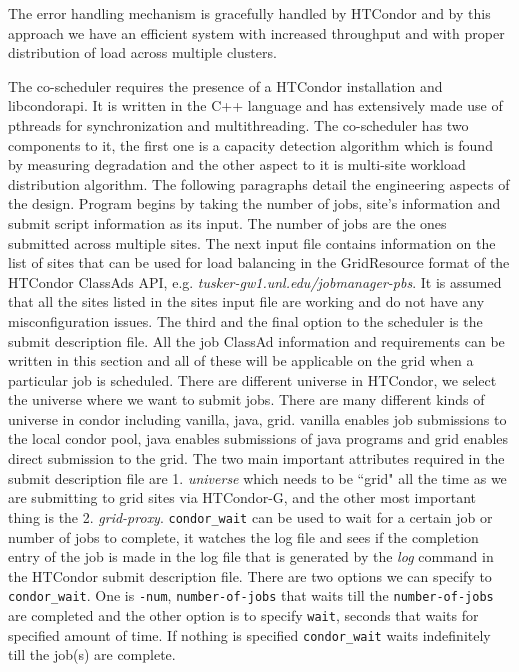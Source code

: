 \documentclass[ms,electronic,double]{nuthesis}
\begin{document}
 The error handling mechanism is gracefully handled by 
 HTCondor and by this approach we have an efficient system with increased throughput and with proper distribution
  of load across multiple clusters.  
        
 
 
 


The co-scheduler requires the presence of a HTCondor installation and libcondorapi.
It is written in the C++ language and has extensively made use of pthreads for 
synchronization and multithreading. The co-scheduler has two components to it, the first one is a capacity detection
algorithm which is found by measuring degradation and the other aspect to it is 
multi-site workload distribution algorithm. The following paragraphs detail the 
engineering aspects of the design. Program begins by taking the number of jobs, site's information and submit script 
information as its input. The number of jobs are the ones submitted across 
multiple sites. The next input file contains information on the list of sites that can be used 
for load balancing in the GridResource format of the HTCondor ClassAds API, e.g. \emph{tusker-gw1.unl.edu/jobmanager-pbs}.
It is assumed that all the sites listed in the sites input file are working and 
do not have any misconfiguration issues. The third and the final option to the 
scheduler is the submit description file. All the job ClassAd information and 
requirements can be written in this section and all of these will be applicable on the grid when a particular job is 
scheduled. There are different universe in HTCondor, we select the universe where we want to submit 
jobs. There are many different kinds of universe in condor including vanilla, java, grid. vanilla enables job submissions to the local
condor pool, java enables submissions of java programs and grid enables direct submission to the grid. 
The two main important attributes required in the submit description 
file are 1. \emph{universe} which needs to be ``grid" all the time as we are submitting 
to grid sites via HTCondor-G, and the other most important thing is the 
2. \emph{grid-proxy}. 
\texttt{condor\_wait} \cite{manual56} can be used to wait for a certain job or 
number of jobs to complete, it watches the log file and sees if the completion 
entry of the job is made in the log file that is generated by the \emph{log} 
command in the HTCondor submit description file. There are two options we can 
specify to \texttt{condor\_wait}. One is \texttt{-num}, \texttt{number-of-jobs} that waits
till the \texttt{number-of-jobs} are completed and the other option is to specify \texttt{wait}, seconds that 
waits for specified amount of time. If nothing is specified \texttt{condor\_wait} waits indefinitely till
the job(s) are complete.
\end{document}
